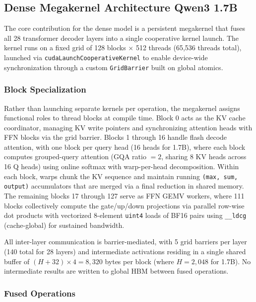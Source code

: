 \documentclass[sigplan,screen]{acmart}
\begin{document}
\subsection{Dense Megakernel Architecture Qwen3 1.7B}
\label{sec:dense}

The core contribution for the dense model is a persistent megakernel that fuses all 28 transformer decoder layers into a single cooperative kernel launch. The kernel runs on a fixed grid of 128 blocks $\times$ 512 threads (65{,}536 threads total), launched via \texttt{cudaLaunchCooperativeKernel} to enable device-wide synchronization through a custom \newline \texttt{GridBarrier} built on global atomics.

\subsubsection{Block Specialization}

Rather than launching separate kernels per operation, the megakernel assigns functional roles to thread blocks at compile time. Block 0 acts as the KV cache coordinator, managing KV write pointers and synchronizing attention heads with FFN blocks via the grid barrier. Blocks 1 through 16 handle flash decode attention, with one block per query head (16 heads for 1.7B), where each block computes grouped-query attention (GQA ratio $= 2$, sharing 8 KV heads across 16 Q heads) using online softmax with warp-per-head decomposition. Within each block, warps chunk the KV sequence and maintain running \texttt{(max, sum, output)} accumulators that are merged via a final reduction in shared memory. The remaining blocks 17 through 127 serve as FFN GEMV workers, where 111 blocks collectively compute the gate/up/down projections via parallel row-wise dot products with vectorized 8-element \texttt{uint4} loads of BF16 pairs using \texttt{\_\_ldcg} (cache-global) for sustained bandwidth.

All inter-layer communication is barrier-mediated, with 5 grid barriers per layer (140 total for 28 layers) and intermediate activations residing in a single shared buffer of $(H + 32) \times 4 = 8{,}320$ bytes per block (where $H = 2{,}048$ for 1.7B). No intermediate results are written to global HBM between fused operations.

\subsubsection{Fused Operations}
\end{document}
